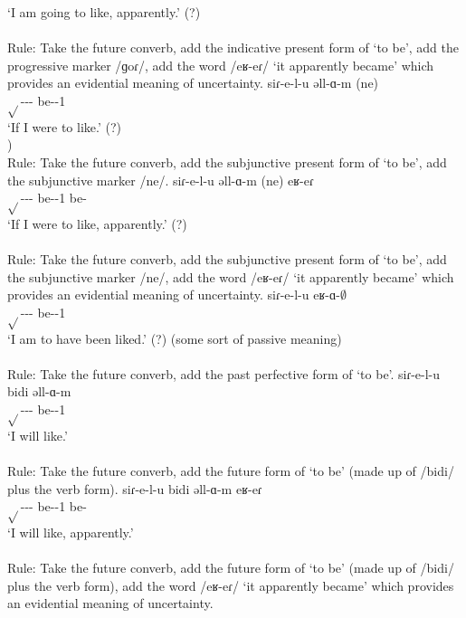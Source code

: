 \begin{exe}
\begin{xlist}
		\trans `I am going to like, apparently.' (?) \\
		 \\
		Rule: Take the future converb, add the indicative present form of `to be', add the progressive marker /ɡoɾ/, add the word /eʁ-eɾ/ `it apparently became' which provides an evidential meaning of uncertainty.
		\ex \gll siɾ-e-l-u əll-ɑ-m (ne) \\
		$\sqrt{}$-{\thgloss}-{\infgloss}-{\futcvb} be-{\thgloss}-1{\sg} {\sbjv} \\
		\trans `If I were to like.' (?) \\
		) \\
		Rule: Take the future converb, add the subjunctive present form of `to be', add the subjunctive marker /ne/.
		\ex \gll siɾ-e-l-u əll-ɑ-m (ne) eʁ-eɾ \\
		$\sqrt{}$-{\thgloss}-{\infgloss}-{\futcvb} be-{\thgloss}-1{\sg} {\sbjv} be-{\eptcp} \\
		\trans `If I were to like, apparently.' (?) \\
		 \\
		Rule: Take the future converb, add the subjunctive present form of `to be', add the subjunctive marker /ne/, add the word /eʁ-eɾ/ `it apparently became' which provides an evidential meaning of uncertainty.
		\ex \gll siɾ-e-l-u eʁ-ɑ-$\emptyset$ \\
		$\sqrt{}$-{\thgloss}-{\infgloss}-{\futcvb} be-{\pst}-1{\sg} \\
		\trans `I am to have been liked.' (?) (some sort of passive meaning) \\
		 \\
		Rule: Take the future converb, add the past perfective form of `to be'. 
		\ex \gll siɾ-e-l-u bidi əll-ɑ-m \\
		$\sqrt{}$-{\thgloss}-{\infgloss}-{\futcvb} {\futcvb} be-{\thgloss}-1{\sg} \\
		\trans `I will like.' \\
		 \\
		Rule: Take the future converb, add the future form of `to be' (made up of /bidi/ plus the verb form). 
		\ex \gll siɾ-e-l-u bidi əll-ɑ-m eʁ-eɾ \\
		$\sqrt{}$-{\thgloss}-{\infgloss}-{\futcvb} {\futcvb} be-{\thgloss}-1{\sg} be-{\eptcp} \\
		\trans `I will like, apparently.' \\
		 \\
		Rule: Take the future converb, add the future form of `to be' (made up of /bidi/ plus the verb form), add the word /eʁ-eɾ/ `it apparently became' which provides an evidential meaning of uncertainty. 
	\end{xlist}
\end{exe}

